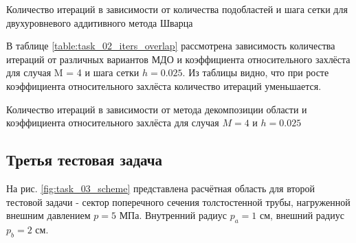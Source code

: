 \documentclass[a4paper]{article}
\begin{document}
\begin{table}[h]
\caption{Количество итераций в зависимости от количества подобластей и шага сетки для двухуровневого аддитивного метода Шварца}
\label{table:task_02_add2_iters}
\end{table}

В таблице \ref{table:task_02_iters_overlap} рассмотрена зависимость количества итераций от различных вариантов МДО и коэффициента относительного захлёста для случая M = 4 и шага сетки $h = 0.025$. Из таблицы видно, что при росте коэффициента относительного захлёста количество итераций уменьшается.

\begin{table}[h]
\caption{Количество итераций в зависимости от метода декомпозиции области и коэффициента относительного захлёста для случая $M = 4$ и $h = 0.025$}
\label{table:task_02_iters_overlap}
\end{table}

\newpage

\subsection{Третья тестовая задача}

На рис. \ref{fig:task_03_scheme} представлена расчётная область для второй тестовой задачи - сектор поперечного сечения толстостенной трубы, нагруженной внешним давлением $p = 5$ МПа. Внутренний радиус $p_a = 1$ см, внешний радиус $p_b = 2 $ см.
\end{document}

